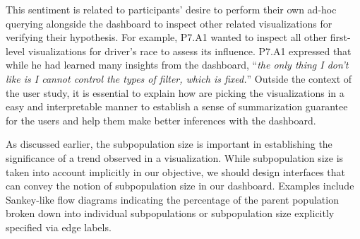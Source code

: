 \npar This sentiment is related to participants' desire to perform their own ad-hoc querying alongside the dashboard to inspect other related visualizations for verifying their hypothesis. For example, P7.A1 wanted to inspect all other first-level visualizations for driver's race to assess its influence. P7.A1 expressed that while he had learned many insights from the dashboard, ``\textit{the only thing I don't like is I cannot control the types of filter, which is fixed.}'' Outside the context of the user study, it is essential to explain how \system are picking the visualizations in a easy and interpretable manner to establish a sense of summarization guarantee for the users and help them make better inferences with the dashboard.
\par As discussed earlier, the subpopulation size is important in establishing the significance of a trend observed in a visualization. While subpopulation size is taken into account implicitly in our objective, we should design interfaces that can convey the notion of subpopulation size in our dashboard. Examples include Sankey-like flow diagrams indicating the percentage of the parent population broken down into individual subpopulations or subpopulation size explicitly specified via edge labels.%
